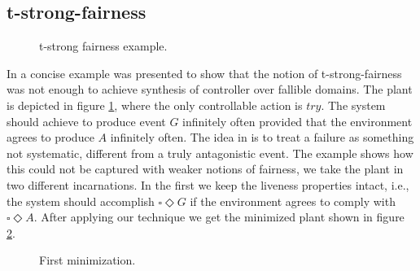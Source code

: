 \subsection{t-strong-fairness}
\begin{figure}[bt]
\centering
\SmallPicture
{}
\vspace*{-2mm}
\caption{t-strong fairness example.}
\label{fig:strongfairness}
\vspace*{-4mm}
\MediumPicture
\end{figure}
In \cite{DBLP:conf/icse/DIppolitoBPU11} a concise example was 
presented to show that the notion of t-strong-fairness was not
enough to achieve synthesis of controller over fallible domains.
The plant is depicted in figure \ref{fig:strongfairness}, where the only
controllable action is $try$.  The system should achieve
to produce event $G$ infinitely often provided that the environment
agrees to produce $A$ infinitely often.  The idea in 
\cite{DBLP:conf/icse/DIppolitoBPU11} is to treat a
failure as something not systematic, different from a truly antagonistic
event.  The example shows how this
could not be captured with weaker notions of fairness, we take 
the plant in two different incarnations.  In the first we keep
the liveness properties intact, i.e., the system should accomplish 
$\square \Diamond G$ if the environment agrees to comply with
$\square \Diamond A$.  After applying our technique we get the
minimized plant shown in figure \ref{fig:strongfairness-min1}.
\begin{figure}[bt]
\centering
\SmallPicture
{}
\vspace*{-2mm}
\caption{First minimization.}
\label{fig:strongfairness-min1}
\vspace*{-4mm}
\MediumPicture
\end{figure}
